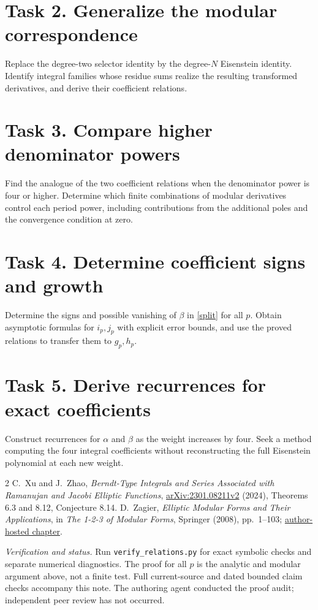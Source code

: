 \documentclass[11pt]{article}
\begin{document}
\section*{Task 2. Generalize the modular correspondence}
Replace the degree-two selector identity by the degree-$N$ Eisenstein
identity. Identify integral families whose residue sums realize the
resulting transformed derivatives, and derive their coefficient relations.

\section*{Task 3. Compare higher denominator powers}
Find the analogue of the two coefficient relations when the denominator
power is four or higher. Determine which finite combinations of modular
derivatives control each period power, including contributions from
the additional poles and the convergence condition at zero.

\section*{Task 4. Determine coefficient signs and growth}
Determine the signs and possible vanishing of $\beta$ in \eqref{split}
for all $p$. Obtain asymptotic formulas for $i_p,j_p$ with explicit error
bounds, and use the proved relations to transfer them to $g_p,h_p$.

\section*{Task 5. Derive recurrences for exact coefficients}
Construct recurrences for $\alpha$ and $\beta$ as the weight increases
by four. Seek a method computing the four integral coefficients without
reconstructing the full Eisenstein polynomial at each new weight.

\begin{thebibliography}{2}
 C.~Xu and J.~Zhao,
\emph{Berndt-Type Integrals and Series Associated with Ramanujan and
Jacobi Elliptic Functions},
\href{https://arxiv.org/abs/2301.08211v2}{arXiv:2301.08211v2} (2024),
Theorems 6.3 and 8.12, Conjecture 8.14.
 D.~Zagier, \emph{Elliptic Modular Forms and Their Applications},
in \emph{The 1-2-3 of Modular Forms}, Springer (2008), pp.~1--103;
\href{https://people.mpim-bonn.mpg.de/zagier/files/doi/10.1007/978-3-540-74119-0_1/fulltext.pdf}{author-hosted chapter}.
\end{thebibliography}
\noindent\textit{Verification and status.}
Run \texttt{verify\_relations.py} for exact symbolic checks and separate
numerical diagnostics. The proof for all $p$ is the analytic and
modular argument above, not a finite test. Full current-source and
dated bounded claim checks accompany this note. The authoring agent
conducted the proof audit; independent peer review has not occurred.
\end{document}

